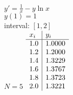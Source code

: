 {
$y' = \displaystyle \frac{1}{x}-y\ln x$\\
$y(1)=1$\\
interval: $[1,2]$\\
$N=5$
}
{
	$\begin{array}[b]{l | l}
		x_i & y_i    \\ \hline
		1.0 & 1.0000 \\
		1.2 & 1.2000 \\
		1.4 & 1.3229 \\
		1.6 & 1.3767 \\
		1.8 & 1.3723 \\
		2.0 & 1.3221 \\
	\end{array}$
}